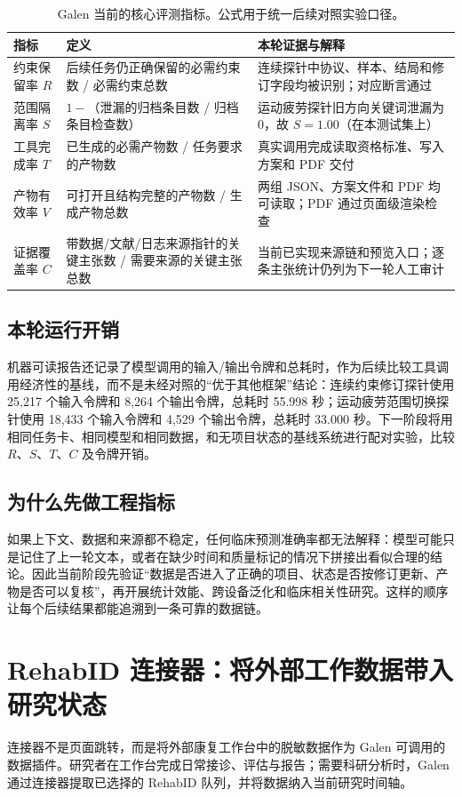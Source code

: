 \documentclass[11pt,a4paper]{article}
\begin{document}
\begin{table}[H]
\centering
\small
\begin{tabularx}{\linewidth}{@{}p{3.1cm}p{3.5cm}Y@{}}
\toprule
指标 & 定义 & 本轮证据与解释 \\
\midrule
约束保留率 $R$ & 后续任务仍正确保留的必需约束数 / 必需约束总数 & 连续探针中协议、样本、结局和修订字段均被识别；对应断言通过 \\
范围隔离率 $S$ & $1-$（泄漏的归档条目数 / 归档条目检查数） & 运动疲劳探针旧方向关键词泄漏为 0，故 $S=1.00$（在本测试集上） \\
工具完成率 $T$ & 已生成的必需产物数 / 任务要求的产物数 & 真实调用完成读取资格标准、写入方案和 PDF 交付 \\
产物有效率 $V$ & 可打开且结构完整的产物数 / 生成产物总数 & 两组 JSON、方案文件和 PDF 均可读取；PDF 通过页面级渲染检查 \\
证据覆盖率 $C$ & 带数据/文献/日志来源指针的关键主张数 / 需要来源的关键主张总数 & 当前已实现来源链和预览入口；逐条主张统计仍列为下一轮人工审计 \\
\bottomrule
\end{tabularx}
\caption{Galen 当前的核心评测指标。公式用于统一后续对照实验口径。}
\end{table}

\subsection{本轮运行开销}
机器可读报告还记录了模型调用的输入/输出令牌和总耗时，作为后续比较工具调用经济性的基线，而不是未经对照的“优于其他框架”结论：连续约束修订探针使用 25,217 个输入令牌和 8,264 个输出令牌，总耗时 55.998 秒；运动疲劳范围切换探针使用 18,433 个输入令牌和 4,529 个输出令牌，总耗时 33.000 秒。下一阶段将用相同任务卡、相同模型和相同数据，和无项目状态的基线系统进行配对实验，比较 $R$、$S$、$T$、$C$ 及令牌开销。

\subsection{为什么先做工程指标}
如果上下文、数据和来源都不稳定，任何临床预测准确率都无法解释：模型可能只是记住了上一轮文本，或者在缺少时间和质量标记的情况下拼接出看似合理的结论。因此当前阶段先验证“数据是否进入了正确的项目、状态是否按修订更新、产物是否可以复核”，再开展统计效能、跨设备泛化和临床相关性研究。这样的顺序让每个后续结果都能追溯到一条可靠的数据链。

\newpage
\section{RehabID 连接器：将外部工作数据带入研究状态}
连接器不是页面跳转，而是将外部康复工作台中的脱敏数据作为 Galen 可调用的数据插件。研究者在工作台完成日常接诊、评估与报告；需要科研分析时，Galen 通过连接器提取已选择的 RehabID 队列，并将数据纳入当前研究时间轴。
\end{document}
